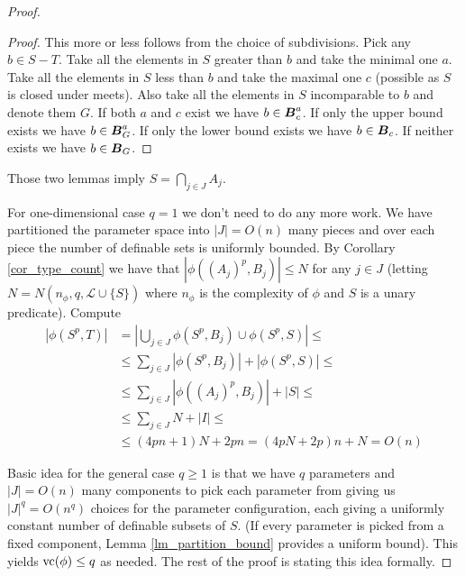\documentclass{amsart}
\DeclareMathOperator{\BT}{\boldface B}
\renewcommand{\LL}{\mathcal L}
\begin{document}
\begin{proof}
  \begin{proof}
    This more or less follows from the choice of subdivisions. Pick any $b \in S - T$. Take all the elements in $S$ greater than $b$ and take the minimal one $a$. Take all the elements in $S$ less than $b$ and take the maximal one $c$ (possible as $S$ is closed under meets). Also take all the elements in $S$ incomparable to $b$ and denote them $G$. If both $a$ and $c$ exist we have $b \in \BT^a_c$. If only the upper bound exists we have $b \in \BT^a_G$. If only the lower bound exists we have $b \in \BT_c$. If neither exists we have $b \in \BT_G$.
  \end{proof}
  
  \begin{Note}
    Those two lemmas imply $S = \bigcap_{j \in J} A_j$.
  \end{Note}
  
  \begin{Note}
    For one-dimensional case $q = 1$ we don't need to do any more work. We have partitioned the parameter space into $|J| = O(n)$ many pieces and over each piece the number of definable sets is uniformly bounded. By Corollary \ref{cor_type_count} we have that $|\phi((A_j)^p, B_j)| \leq N$ for any $j \in J$ (letting $N = N(n_\phi, q, \LL \cup \{S\})$ where $n_\phi$ is the complexity of $\phi$ and $S$ is a unary predicate). Compute
    \begin{align*}
      |\phi(S^p, T)|
      &= \left|\bigcup_{j \in J} \phi(S^p, B_j) \cup \phi(S^p, S)\right| \leq \\
      &\leq \sum_{j \in J} |\phi(S^p, B_j)| + |\phi(S^p, S)| \leq \\
      &\leq \sum_{j \in J} |\phi((A_j)^p, B_j)| + |S| \leq \\
      &\leq \sum_{j \in J}N + |I| \leq \\
      &\leq (4pn + 1)N + 2pn = (4pN + 2p)n + N = O(n)
    \end{align*}
  \end{Note}
  Basic idea for the general case $q \geq 1$ is that we have $q$ parameters and $|J| = O(n)$ many components to pick each parameter from giving us $|J|^q = O(n^q)$ choices for the parameter configuration, each giving a uniformly constant number of definable subsets of $S$. (If every parameter is picked from a fixed component, Lemma \ref{lm_partition_bound} provides a uniform bound). This yields $\operatorname{vc}(\phi) \leq q$ as needed. The rest of the proof is stating this idea formally.
  

\end{proof}
\end{document}
